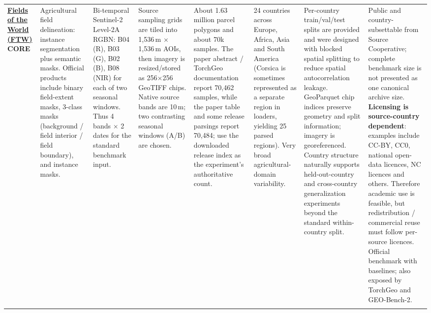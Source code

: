 \begin{landscape}
\begin{longtable}{
    Q{1.8cm}
    Q{2.5cm}
    Q{3.0cm}
    Q{2.5cm}
    Q{2.1cm}
    Q{3.0cm}
    Q{3.4cm}
    Q{3.4cm}
}
\href{https://source.coop/kerner-lab/fields-of-the-world}{\textbf{Fields of the World (FTW)}}\newline
\textbf{CORE}
&
Agricultural field delineation: instance segmentation plus semantic masks. Official products include binary field-extent masks, 3-class masks (background / field interior / field boundary), and instance masks.
&
Bi-temporal Sentinel-2 Level-2A RGBN: B04 (R), B03 (G), B02 (B), B08 (NIR) for each of two seasonal windows. Thus 4 bands $\times$ 2 dates for the standard benchmark input.
&
Source sampling grids are tiled into 1,536\,m $\times$ 1,536\,m AOIs, then imagery is resized/stored as 256$\times$256 GeoTIFF chips. Native source bands are 10\,m; two contrasting seasonal windows (A/B) are chosen.
&
About 1.63 million parcel polygons and about 70k samples. The paper abstract / TorchGeo documentation report 70,462 samples, while the paper table and some release parsings report 70,484; use the downloaded release index as the experiment's authoritative count.
&
24 countries across Europe, Africa, Asia and South America (Corsica is sometimes represented as a separate region in loaders, yielding 25 parsed regions). Very broad agricultural-domain variability.
&
Per-country train/val/test splits are provided and were designed with blocked spatial splitting to reduce spatial autocorrelation leakage. GeoParquet chip indices preserve geometry and split information; imagery is georeferenced. Country structure naturally supports held-out-country and cross-country generalization experiments beyond the standard within-country split.
&
Public and country-subsettable from Source Cooperative; complete benchmark size is not presented as one canonical archive size. \textbf{Licensing is source-country dependent}: examples include CC-BY, CC0, national open-data licences, NC licences and others. Therefore academic use is feasible, but redistribution / commercial reuse must follow per-source licences. Official benchmark with baselines; also exposed by TorchGeo and GEO-Bench-2.
\\
\addlinespace


\end{longtable}
\end{landscape}
